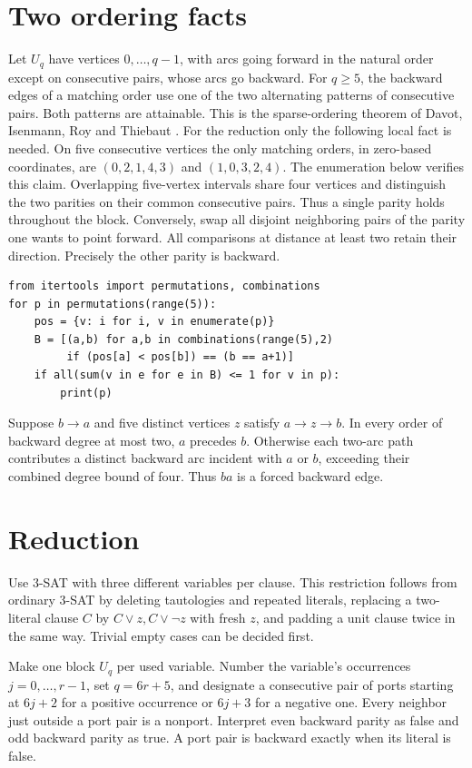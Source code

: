 \documentclass[10pt]{article}
\begin{document}
\section{Two ordering facts}
Let $U_q$ have vertices $0,\ldots,q-1$, with arcs going forward in the natural order except on consecutive pairs, whose arcs go backward. For $q\ge5$, the backward edges of a matching order use one of the two alternating patterns of consecutive pairs. Both patterns are attainable. This is the sparse-ordering theorem of Davot, Isenmann, Roy and Thiebaut \cite[Theorem 4 of the preprint]{dir}. For the reduction only the following local fact is needed. On five consecutive vertices the only matching orders, in zero-based coordinates, are $(0,2,1,4,3)$ and $(1,0,3,2,4)$. The enumeration below verifies this claim. Overlapping five-vertex intervals share four vertices and distinguish the two parities on their common consecutive pairs. Thus a single parity holds throughout the block. Conversely, swap all disjoint neighboring pairs of the parity one wants to point forward. All comparisons at distance at least two retain their direction. Precisely the other parity is backward.
\begin{verbatim}
from itertools import permutations, combinations
for p in permutations(range(5)):
    pos = {v: i for i, v in enumerate(p)}
    B = [(a,b) for a,b in combinations(range(5),2)
         if (pos[a] < pos[b]) == (b == a+1)]
    if all(sum(v in e for e in B) <= 1 for v in p):
        print(p)
\end{verbatim}
Suppose $b\to a$ and five distinct vertices $z$ satisfy $a\to z\to b$. In every order of backward degree at most two, $a$ precedes $b$. Otherwise each two-arc path contributes a distinct backward arc incident with $a$ or $b$, exceeding their combined degree bound of four. Thus $ba$ is a forced backward edge.

\section{Reduction}
Use 3-SAT with three different variables per clause. This restriction follows from ordinary 3-SAT by deleting tautologies and repeated literals, replacing a two-literal clause $C$ by $C\vee z,C\vee\neg z$ with fresh $z$, and padding a unit clause twice in the same way. Trivial empty cases can be decided first.

Make one block $U_q$ per used variable. Number the variable's occurrences $j=0,\ldots,r-1$, set $q=6r+5$, and designate a consecutive pair of ports starting at $6j+2$ for a positive occurrence or $6j+3$ for a negative one. Every neighbor just outside a port pair is a nonport. Interpret even backward parity as false and odd backward parity as true. A port pair is backward exactly when its literal is false.
\end{document}
